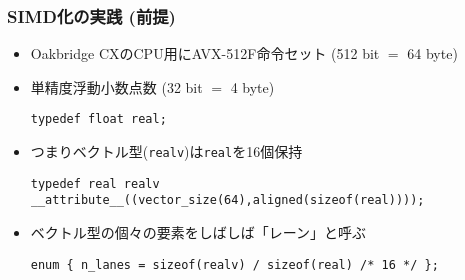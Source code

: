 \documentclass[10pt,dvipdfmx]{beamer}
\newcommand{\ao}[1]{{\color{blue}#1}}
\begin{document}
\iffalse
\begin{frame}[fragile]
  \frametitle{SIMD化の実践 (前提)}

  \begin{itemize}
  \item ReedbushのCPU用にAVX2命令セット (256 bit $=$ 32 byte)
  \item 単精度浮動小数点数 (32 bit $=$ 4 byte)
\begin{lstlisting}
typedef float real;
\end{lstlisting}
  \item つまりベクトル型(\texttt{realv})は\texttt{real}を8個保持
\begin{lstlisting}
typedef real realv __attribute__((vector_size(32),aligned(sizeof(real))));
\end{lstlisting}

\item ベクトル型の個々の要素をしばしば\ao{「レーン」}と呼ぶ
\begin{lstlisting}
enum { n_lanes = sizeof(realv) / sizeof(real) /* 8 */ };
\end{lstlisting}
  \end{itemize}
\end{frame}
\fi

\begin{frame}[fragile]
  \frametitle{SIMD化の実践 (前提)}

  \begin{itemize}
  \item Oakbridge CXのCPU用にAVX-512F命令セット (512 bit $=$ 64 byte)
  \item 単精度浮動小数点数 (32 bit $=$ 4 byte)
\begin{lstlisting}
typedef float real;
\end{lstlisting}
  \item つまりベクトル型(\texttt{realv})は\texttt{real}を16個保持
\begin{lstlisting}
typedef real realv __attribute__((vector_size(64),aligned(sizeof(real))));
\end{lstlisting}

\item ベクトル型の個々の要素をしばしば\ao{「レーン」}と呼ぶ
\begin{lstlisting}
enum { n_lanes = sizeof(realv) / sizeof(real) /* 16 */ };
\end{lstlisting}
  \end{itemize}
\end{frame}
\end{document}
